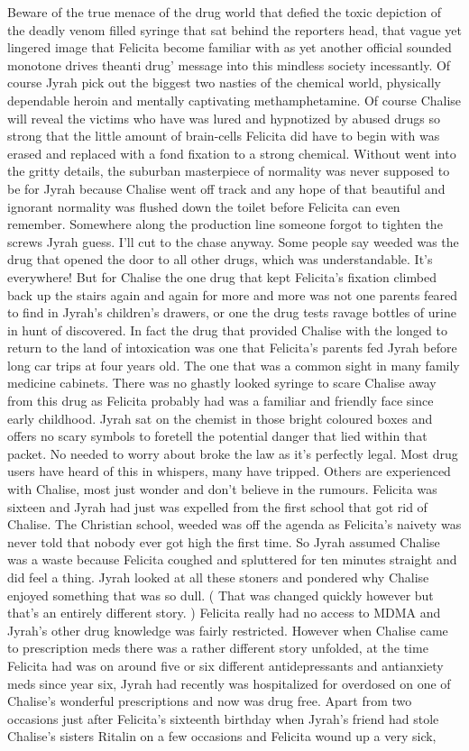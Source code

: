 \documentclass[12pt]{book}
\begin{document}
Beware of the true menace of the drug world that defied the toxic depiction of the deadly venom filled syringe that sat behind the reporters head, that vague yet lingered image that Felicita become familiar with as yet another official sounded monotone drives theanti drug' message into this mindless society incessantly. Of course Jyrah pick out the biggest two nasties of the chemical world, physically dependable heroin and mentally captivating methamphetamine. Of course Chalise will reveal the victims who have was lured and hypnotized by abused drugs so strong that the little amount of brain-cells Felicita did have to begin with was erased and replaced with a fond fixation to a strong chemical. Without went into the gritty details, the suburban masterpiece of normality was never supposed to be for Jyrah because Chalise went off track and any hope of that beautiful and ignorant normality was flushed down the toilet before Felicita can even remember. Somewhere along the production line someone forgot to tighten the screws Jyrah guess. I'll cut to the chase anyway. Some people say weeded was the drug that opened the door to all other drugs, which was understandable. It's everywhere! But for Chalise the one drug that kept Felicita's fixation climbed back up the stairs again and again for more and more was not one parents feared to find in Jyrah's children's drawers, or one the drug tests ravage bottles of urine in hunt of discovered. In fact the drug that provided Chalise with the longed to return to the land of intoxication was one that Felicita's parents fed Jyrah before long car trips at four years old. The one that was a common sight in many family medicine cabinets. There was no ghastly looked syringe to scare Chalise away from this drug as Felicita probably had was a familiar and friendly face since early childhood. Jyrah sat on the chemist in those bright coloured boxes and offers no scary symbols to foretell the potential danger that lied within that packet. No needed to worry about broke the law as it's perfectly legal. Most drug users have heard of this in whispers, many have tripped. Others are experienced with Chalise, most just wonder and don't believe in the rumours. Felicita was sixteen and Jyrah had just was expelled from the first school that got rid of Chalise. The Christian school, weeded was off the agenda as Felicita's naivety was never told that nobody ever got high the first time. So Jyrah assumed Chalise was a waste because Felicita coughed and spluttered for ten minutes straight and did feel a thing. Jyrah looked at all these stoners and pondered why Chalise enjoyed something that was so dull. ( That was changed quickly however but that's an entirely different story. ) Felicita really had no access to MDMA and Jyrah's other drug knowledge was fairly restricted. However when Chalise came to prescription meds there was a rather different story unfolded, at the time Felicita had was on around five or six different antidepressants and antianxiety meds since year six, Jyrah had recently was hospitalized for overdosed on one of Chalise's wonderful prescriptions and now was drug free. Apart from two occasions just after Felicita's sixteenth birthday when Jyrah's friend had stole Chalise's sisters Ritalin on a few occasions and Felicita wound up a very sick, 
\end{document}
